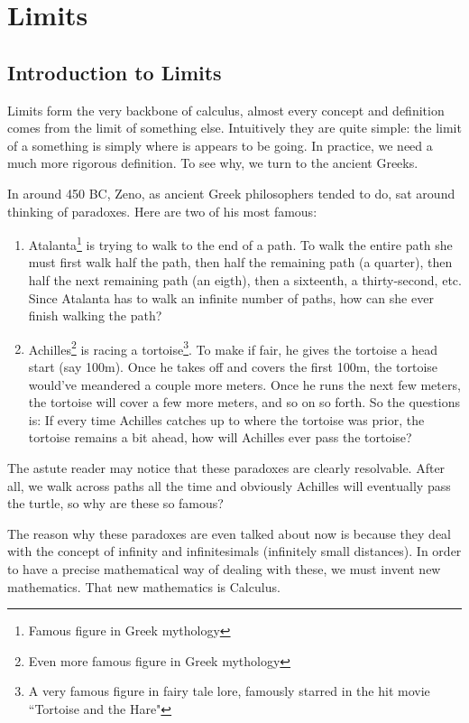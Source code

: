 \section{Limits}
\subsection{Introduction to Limits}
Limits form the very backbone of calculus, almost every concept and definition comes from the limit of something else. Intuitively they are quite simple: the limit of a something is simply where is appears to be going. In practice, we need a much more rigorous definition. To see why, we turn to the ancient Greeks.

In around 450 BC, Zeno, as ancient Greek philosophers tended to do, sat around thinking of paradoxes. Here are two of his most famous:
\begin{enumerate}
	\item Atalanta\footnote{Famous figure in Greek mythology} is trying to walk to the end of a path. To walk the entire path she must first walk half the path, then half the remaining path (a quarter), then half the next remaining path (an eigth), then a sixteenth, a thirty-second, etc. Since Atalanta has to walk an infinite number of paths, how can she ever finish walking the path? 
	\item Achilles\footnote{Even more famous figure in Greek mythology} is racing a tortoise\footnote{A very famous figure in fairy tale lore, famously starred in the hit movie ``Tortoise and the Hare"}. To make if fair, he gives the tortoise a head start (say 100m). Once he takes off and covers the first 100m, the tortoise would've meandered a couple more meters. Once he runs the next few meters, the tortoise will cover a few more meters, and so on so forth. So the questions is: If every time Achilles catches up to where the tortoise was prior, the tortoise remains a bit ahead, how will Achilles ever pass the tortoise?
\end{enumerate}

The astute reader may notice that these paradoxes are clearly resolvable. After all, we walk across paths all the time and obviously Achilles will eventually pass the turtle, so why are these so famous? 

The reason why these paradoxes are even talked about now is because they deal with the concept of infinity and infinitesimals (infinitely small distances). In order to have a precise mathematical way of dealing with these, we must invent new mathematics. That new mathematics is Calculus.


